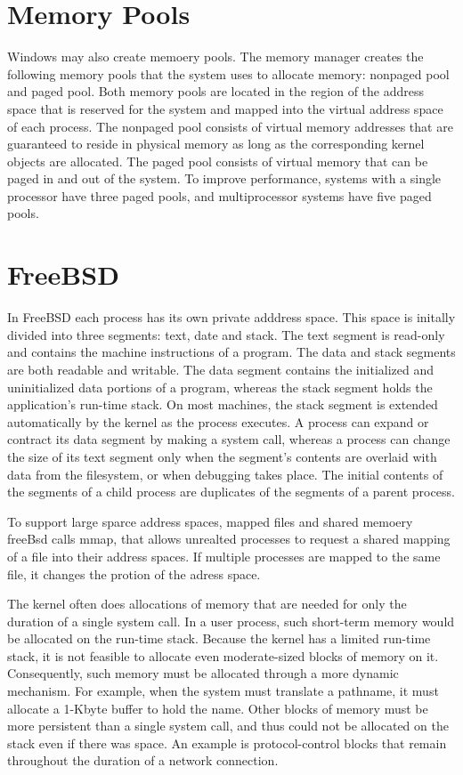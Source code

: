 \documentclass[letterpaper,10pt,draftclsnofoot,onecolumn]{IEEEtran}
\begin{document}
\section*{Memory Pools}
Windows may also create memoery pools. The memory manager creates the following memory pools that the system uses to allocate memory: nonpaged pool and paged pool. Both memory pools are located in the region of the address space that is reserved for the system and mapped into the virtual address space of each process. The nonpaged pool consists of virtual memory addresses that are guaranteed to reside in physical memory as long as the corresponding kernel objects are allocated. The paged pool consists of virtual memory that can be paged in and out of the system. To improve performance, systems with a single processor have three paged pools, and multiprocessor systems have five paged pools.  

%
%

\section*{FreeBSD}

In FreeBSD each process has its own private adddress space. This space is initally divided into three segments: text, date and stack. The text segment is read-only and contains the machine instructions of a program. The data and stack segments are both readable and writable. The data segment contains the initialized and uninitialized data portions of a program, whereas the stack segment holds the application's run-time stack. On most machines, the stack segment is extended automatically by the kernel as the process executes. A process can expand or contract its data segment by making a system call, whereas a process can change the size of its text segment only when the segment's contents are overlaid with data from the filesystem, or when debugging takes place. The initial contents of the segments of a child process are duplicates of the segments of a parent process.

To support large sparce address spaces, mapped files and shared memoery freeBsd calls mmap, that allows unrealted processes to request a shared mapping of a file into their address spaces. If multiple processes are mapped to the same file, it changes the protion of the adress space.

The kernel often does allocations of memory that are needed for only the duration of a single system call. In a user process, such short-term memory would be allocated on the run-time stack. Because the kernel has a limited run-time stack, it is not feasible to allocate even moderate-sized blocks of memory on it. Consequently, such memory must be allocated through a more dynamic mechanism. For example, when the system must translate a pathname, it must allocate a 1-Kbyte buffer to hold the name. Other blocks of memory must be more persistent than a single system call, and thus could not be allocated on the stack even if there was space. An example is protocol-control blocks that remain throughout the duration of a network connection.\cite{[2]}
\end{document}
